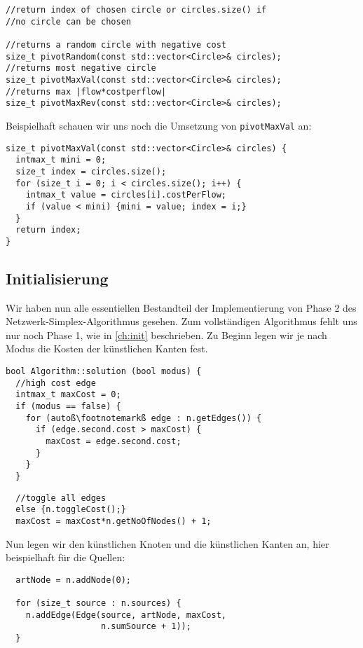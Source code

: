 \begin{lstlisting}
//return index of chosen circle or circles.size() if
//no circle can be chosen

//returns a random circle with negative cost
size_t pivotRandom(const std::vector<Circle>& circles);
//returns most negative circle
size_t pivotMaxVal(const std::vector<Circle>& circles);
//returns max |flow*costperflow|
size_t pivotMaxRev(const std::vector<Circle>& circles);
\end{lstlisting}

Beispielhaft schauen wir uns noch die Umsetzung von \lstinline|pivotMaxVal| an:

\begin{lstlisting}
size_t pivotMaxVal(const std::vector<Circle>& circles) {
  intmax_t mini = 0;
  size_t index = circles.size();
  for (size_t i = 0; i < circles.size(); i++) {
    intmax_t value = circles[i].costPerFlow;
    if (value < mini) {mini = value; index = i;}
  }
  return index;
}
\end{lstlisting}

\subsection{Initialisierung}\label{ch:HCLC}
Wir haben nun alle essentiellen Bestandteil der Implementierung von Phase 2 des Netzwerk-Simplex-Algorithmus gesehen. Zum vollständigen Algorithmus fehlt uns nur noch Phase 1, wie in \cref{ch:init} beschrieben. Zu Beginn legen wir je nach Modus die Kosten der künstlichen Kanten fest.

\begin{lstlisting}[escapechar=ß]
bool Algorithm::solution (bool modus) {
  //high cost edge
  intmax_t maxCost = 0;
  if (modus == false) {
    for (autoß\footnotemarkß edge : n.getEdges()) {
      if (edge.second.cost > maxCost) {
        maxCost = edge.second.cost;
      }
    }
  }
\end{lstlisting}
\begin{lstlisting}
  //toggle all edges
  else {n.toggleCost();}
  maxCost = maxCost*n.getNoOfNodes() + 1;
\end{lstlisting}


Nun legen wir den künstlichen Knoten und die künstlichen Kanten an, hier beispielhaft für die Quellen:
\begin{lstlisting}
  artNode = n.addNode(0);
  
  for (size_t source : n.sources) {
    n.addEdge(Edge(source, artNode, maxCost,
                   n.sumSource + 1));
  }
\end{lstlisting}

